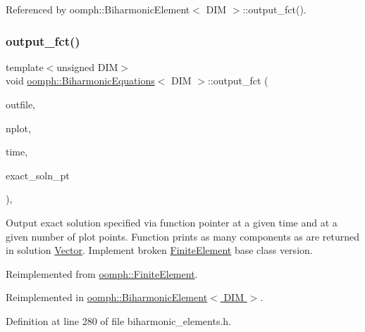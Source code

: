 Referenced by oomph\+::\+Biharmonic\+Element$<$ D\+I\+M $>$\+::output\+\_\+fct().

\mbox{\label{classoomph_1_1BiharmonicEquations_a4899086db9350750d873a076a75d150d}} 
\subsubsection{\texorpdfstring{output\+\_\+fct()}{output\_fct()}\hspace{0.1cm}{\footnotesize\ttfamily [2/2]}}
{\footnotesize\ttfamily template$<$unsigned D\+IM$>$ \\
void \hyperlink{classoomph_1_1BiharmonicEquations}{oomph\+::\+Biharmonic\+Equations}$<$ D\+IM $>$\+::output\+\_\+fct (\begin{DoxyParamCaption}\item[{std\+::ostream \&}]{outfile,  }\item[{const unsigned \&}]{nplot,  }\item[{const double \&}]{time,  }\item[{\hyperlink{classoomph_1_1FiniteElement_ad4ecf2b61b158a4b4d351a60d23c633e}{Finite\+Element\+::\+Unsteady\+Exact\+Solution\+Fct\+Pt}}]{exact\+\_\+soln\+\_\+pt }\end{DoxyParamCaption})\hspace{0.3cm}{\ttfamily [inline]}, {\ttfamily [virtual]}}



Output exact solution specified via function pointer at a given time and at a given number of plot points. Function prints as many components as are returned in solution \hyperlink{classoomph_1_1Vector}{Vector}. Implement broken \hyperlink{classoomph_1_1FiniteElement}{Finite\+Element} base class version. 



Reimplemented from \hyperlink{classoomph_1_1FiniteElement_a2a8426dccd57b927be0ae0eec00d0479}{oomph\+::\+Finite\+Element}.



Reimplemented in \hyperlink{classoomph_1_1BiharmonicElement_ad8a8d7e9f534480b7acf45716dc62721}{oomph\+::\+Biharmonic\+Element$<$ D\+I\+M $>$}.



Definition at line 280 of file biharmonic\+\_\+elements.\+h.



